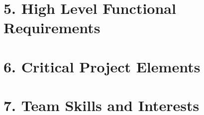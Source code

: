 \documentclass{article}
\begin{document}
\section*{5. High Level Functional Requirements}



\section*{6. Critical Project Elements}



\newpage
\section*{7. Team Skills and Interests}
\end{document}
